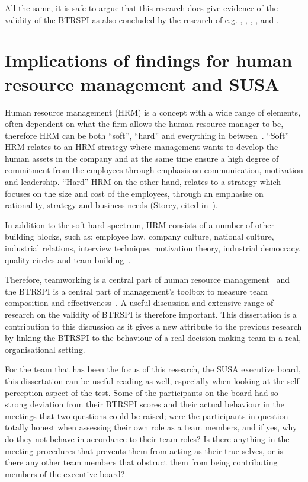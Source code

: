 \documentclass[a4paper,12pt,titlepage]{report}
\begin{document}
  All the same, it is safe to argue that this research does give evidence
  of the validity of the BTRSPI as also concluded by the
  research of e.g. \citet{sfthwm3}, \citet{sfwmjw},
  \citet{sstm}, \citet{bwmg}, \citet{ysht} and \citet{jssd}.

  \section{Implications of findings for human resource management and SUSA}
  Human resource management (HRM) is a concept with a wide range of elements,
  often dependent on what the firm allows the human resource manager to be,
  therefore HRM can be both ``soft'', ``hard'' and everything
  in between~\citep{pthr,jhjl}. ``Soft'' HRM relates to an HRM strategy where
  management wants to develop the human assets in the company and at the
  same time ensure a high degree of commitment from the employees through
  emphasis on communication, motivation and leadership. ``Hard'' HRM on the other hand,
  relates to a strategy which focuses on the size and cost of the employees, through
  an emphasise on rationality, strategy and business
  needs (Storey, cited in~\citet[47-48]{jhjl}).

  In addition to the soft-hard spectrum, HRM consists of a number of
  other building blocks, such as; employee law, company culture, national culture,
  industrial relations, interview technique, motivation theory,
  industrial democracy, quality circles and team
  building~\citep{ahdb,sr,jhbm}.

  Therefore, teamworking is a central part of
  human resource management~\citep{fzje} and
  the BTRSPI is a central part of management's toolbox to measure
  team composition and effectiveness~\cite[697]{dphh}.
  A useful discussion and extensive range
  of research on the validity of BTRSPI is therefore important. This dissertation
  is a contribution to this discussion as it gives a new attribute to the
  previous research by linking the BTRSPI to the behaviour of a real
  decision making team in a real, organisational setting.

  For the team that has been the focus of this research, the SUSA executive
  board, this dissertation can be useful reading as well, especially
  when looking at the self perception aspect of the test. Some of the
  participants on the board had so strong deviation from their BTRSPI scores and their
  actual behaviour in the meetings that two questions
  could be raised; were the participants in question totally honest
  when assessing their own role as a team members,
  and if yes, why do they not behave in accordance to their team roles?
  Is there anything in the meeting procedures that prevents them
  from acting as their true selves, or is there any other team members
  that obstruct them from being contributing members of the executive board?
\end{document}
